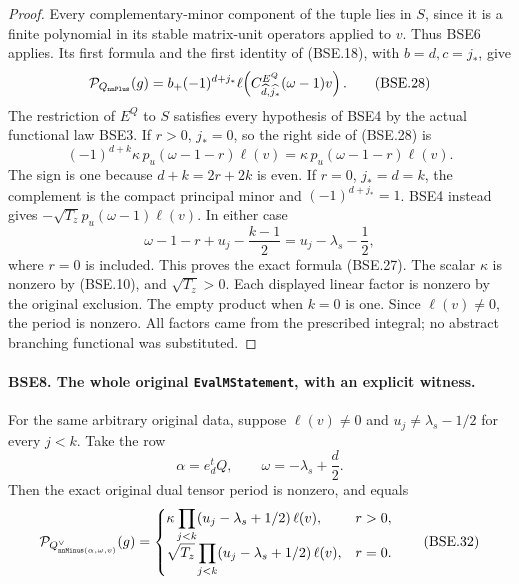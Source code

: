 \documentclass[11pt,a4paper]{article}
\numberwithin{equation}{section}
\theoremstyle{remark}\newtheorem{remark}[theorem]{Remark}
\begin{document}
\begin{proof}
Every complementary-minor component of the tuple lies in $S$,
since it is a finite polynomial in its stable matrix-unit
operators applied to $v$.  Thus BSE6 applies.
Its first formula and the first identity of (BSE.18), with
$b=d,c=j_*$, give
\[
 \mathcal P_{Q_{\texttt{nn\allowbreak Plus}}}(g)
       =b_+(-1)^{d+j_*}
                 \ell\!\left(C^{E^Q}_{\widehat d,\widehat{j_*}}
                                           (\omega-1)v\right).
 \tag{BSE.28}
\]
The restriction of $E^Q$ to $S$ satisfies every hypothesis of
BSE4 by the actual functional law BSE3.
If $r>0$, $j_*=0$, so the right side of (BSE.28) is
\[
       (-1)^{d+k}\kappa\,p_u(\omega-1-r)\ell(v)
                              =\kappa\,p_u(\omega-1-r)\ell(v).
 \tag{BSE.29}
\]
The sign is one because $d+k=2r+2k$ is even.
If $r=0$, $j_*=d=k$, the complement is the compact principal
minor and $(-1)^{d+j_*}=1$.
BSE4 instead gives $-\sqrt{T_z}p_u(\omega-1)\ell(v)$.
In either case
\[
 \omega-1-r+u_j-\frac{k-1}{2}
                                  =u_j-\lambda_s-\frac12,
 \tag{BSE.30}
\]
where $r=0$ is included.  This proves the exact formula (BSE.27).
The scalar $\kappa$ is nonzero by (BSE.10), and $\sqrt{T_z}>0$.
Each displayed linear factor is nonzero by the original exclusion.
The empty product when $k=0$ is one.
Since $\ell(v)\ne0$, the period is nonzero.
All factors came from the prescribed integral; no abstract
branching functional was substituted.
\end{proof}

\paragraph{BSE8. The whole original \texttt{Eval\allowbreak MStatement}, with an explicit witness.}
\label{claim:BSE8}
For the same arbitrary original data, suppose $\ell(v)\ne0$ and
$u_j\ne\lambda_s-1/2$ for every $j<k$.
Take the row
\[
                    \alpha=e_d^tQ,\qquad
                    \omega=-\lambda_s+\frac d2 .
 \tag{BSE.31}
\]
Then the exact original dual tensor period is nonzero, and equals
\[
 \mathcal P_{Q^\vee_{\texttt{nn\allowbreak Minus}(\alpha,\omega,v)}}(g)
   =
 \begin{cases}
 \displaystyle \kappa\prod_{j<k}(u_j-\lambda_s+1/2)\,\ell(v),
                                                    &r>0,\\[2mm]
 \displaystyle \sqrt{T_z}\prod_{j<k}(u_j-\lambda_s+1/2)\,\ell(v),
                                                    &r=0 .
 \end{cases}
 \tag{BSE.32}
\]
\end{document}
